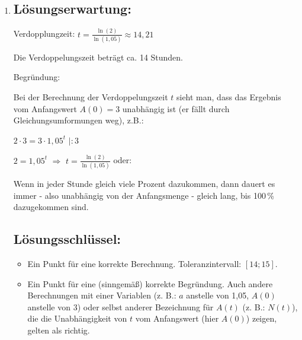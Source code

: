 \begin{langesbeispiel}
{\begin{enumerate}
	Dem vorliegenden exponentiellen Wachstum bzgl. der Fläche der Bakterienkultur wird durch die Größe der Petrischale (ca $2\,376$\,mm$²$) eine Grenze gesetzt.
 
	 	
	\subsection{Lösungsschlüssel:}
	\begin{itemize}
		\item  Ein Ausgleichspunkt ist nur dann zu geben, wenn für beide Lücken ausschließlich der jeweils richtige Satzteil angekreuzt ist.
		\item  Ein Punkt für eine (sinngemäß) korrekte Beschreibung. Korrekt sind alle Antworten, die erläutern, dass kein unbeschränktes Wachstum innerhalb der Petrischale möglich ist.
	\end{itemize}
	
	\item \subsection{Lösungserwartung:}
		Verdopplungzeit: $t=\frac{\ln(2)}{\ln(1,05)}\approx 14,21$
		
		Die Verdoppelungszeit beträgt ca. 14 Stunden.
		
		Begründung:
		
		Bei der Berechnung der Verdoppelungszeit $t$ sieht man, dass das Ergebnis vom Anfangswert $A(0)=3$ unabhängig ist (er fällt durch Gleichungsumformungen weg), z.B.:
		
		$2\cdot 3=3\cdot 1,05^t$\hspace{1cm} $|:3$
		
		$2=1,05^t$ $\Rightarrow$ $t=\frac{\ln(2)}{\ln(1,05)}$ oder:
		
		Wenn in jeder Stunde gleich viele Prozent dazukommen, dann dauert es immer - also unabhängig von der Anfangsmenge - gleich lang, bis 100\,\% dazugekommen sind.
		
		
	\subsection{Lösungsschlüssel:}
	
\begin{itemize}
	\item Ein Punkt für eine korrekte Berechnung. Toleranzintervall: $[14; 15]$.
	\item  Ein Punkt für eine (sinngemäß) korrekte Begründung. Auch andere Berechnungen mit einer Variablen (z. B.: $a$ anstelle von 1,05, $A(0)$ anstelle von $3$) oder selbst anderer Bezeichnung für $A(t)$ (z. B.: $N(t)$), die die Unabhängigkeit von $t$ vom Anfangswert (hier $A(0)$) zeigen, gelten als richtig. 
\end{itemize}
\end{enumerate}}
		\end{langesbeispiel}